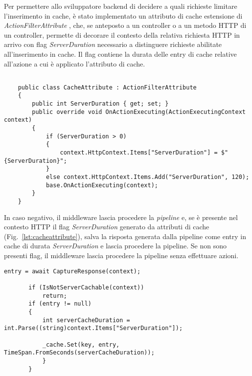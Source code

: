 Per permettere allo sviluppatore backend di decidere a quali richieste limitare l'inserimento in cache, è stato implementato un attributo di cache estensione di \\ \textit{ActionFilterAttribute} \cite{ACTIONFILTER}, che, se anteposto a un controller o a un metodo HTTP di un controller, permette di decorare il contesto della relativa richiesta HTTP \cite{HTTPCONTEXT} in arrivo con flag \textit{ServerDuration} necessario a distinguere richieste abilitate all'inserimento in cache.
Il flag contiene la durata delle entry di cache relative all'azione a cui è applicato l'attributo di cache.

\begin{lstlisting}[caption={CacheAttribute.cs}, style=javaScriptCode, label={lst:cacheattribute}]

    public class CacheAttribute : ActionFilterAttribute
    {
        public int ServerDuration { get; set; }
        public override void OnActionExecuting(ActionExecutingContext context)
        {
            if (ServerDuration > 0)
            {
                context.HttpContext.Items["ServerDuration"] = $"{ServerDuration}";
            }
            else context.HttpContext.Items.Add("ServerDuration", 120);
            base.OnActionExecuting(context);
        }
    }
\end{lstlisting}

In caso negativo, il middleware lascia procedere la \textit{pipeline} e, se è presente nel contesto HTTP \cite{HTTPCONTEXT} il flag \textit{ServerDuration} generato da attributi di cache \cite{ACTIONFILTER} (Fig.~\ref{lst:cacheattribute}), salva la risposta generata dalla pipeline come entry in cache di durata \textit{ServerDuration} e lascia procedere la pipeline. Se non sono presenti flag, il middleware lascia procedere la pipeline senza effettuare azioni.

\begin{lstlisting}[caption={TotallyOriginalCachingMiddleware.cs, Cache miss}, style=javaScriptCode]
entry = await CaptureResponse(context);

       if (IsNotServerCachable(context))
           return;
       if (entry != null)
       {
           int serverCacheDuration = int.Parse((string)context.Items["ServerDuration"]);

           _cache.Set(key, entry, TimeSpan.FromSeconds(serverCacheDuration));
           }
       }
\end{lstlisting}
